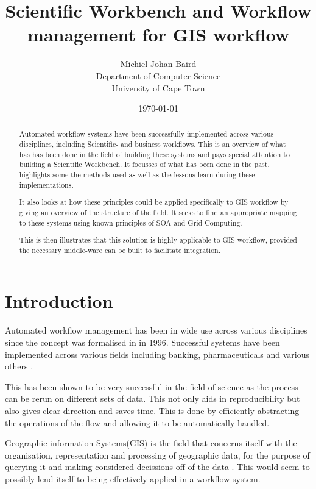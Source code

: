 \documentclass[11pt,twocolumn]{article}
\title{Scientific Workbench and Workflow management for GIS workflow}
\author{
    Michiel Johan Baird \\
        Department of Computer Science \\
        University of Cape Town
}
\date{\today}
\begin{document}
\maketitle
\begin{abstract}
    Automated workflow systems have been successfully implemented
    across various disciplines, including Scientific- and business
    workflows. This is an overview of what has has been done
    in the field of building these systems and pays special attention
    to building a Scientific Workbench. It focusses of what
    has been done in the past, highlights some the methods used
    as well as the lessons learn during these implementations.

    It also looks at how these principles could be applied
    specifically to GIS workflow by giving an overview of the
    structure of the field. It seeks to find an appropriate
    mapping to these systems using known principles of SOA and
    Grid Computing.

    This is then illustrates that this solution is highly applicable
    to GIS workflow, provided the necessary middle-ware can be built
    to facilitate integration.
\end{abstract}
\section{Introduction}
    Automated workflow management has been in wide use across
    various disciplines since the concept was formalised in in
    1996\cite{springerlink:10.1007/BF00136712}. Successful systems
    have been implemented across various fields including banking,
    pharmaceuticals and various others
    \cite{Brahe:2007:SWW:1316624.1316661,5407993}.

    This has been shown to be very successful in the field of science as
    the process can be rerun on different sets of data.\cite{4721191}
    This not only aids in reproducibility but also gives
    clear direction and saves time. This is done by efficiently
    abstracting the operations of the flow and allowing it
    to be automatically handled.

    Geographic information Systems(GIS) is the field that
    concerns itself with the organisation, representation
    and processing of geographic data, for the purpose of
    querying it and making considered decissions off of the data
    \cite{DiMartino:2007:TAG:1341012.1341081}. This would
    seem to possibly lend itself to being effectively applied
    in a workflow system.
\end{document}
